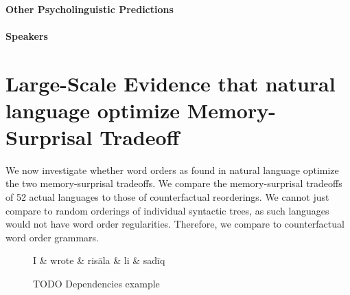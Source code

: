 \documentclass[11pt,letterpaper]{article}
\begin{document}





\paragraph{Other Psycholinguistic Predictions}


\paragraph{Speakers}



\section{Large-Scale Evidence that natural language optimize Memory-Surprisal Tradeoff}

We now investigate whether word orders as found in natural language optimize the two memory-surprisal tradeoffs.
We compare the memory-surprisal tradeoffs of 52 actual languages to those of counterfactual reorderings.
We cannot just compare to random orderings of individual syntactic trees, as such languages would not have word order regularities.
Therefore, we compare to counterfactual word order grammars.

\begin{figure}
\centering
\begin{dependency}[theme = simple]
   \begin{deptext}[column sep=1em]
	   I \&	   wrote \& risāla \& li \& sadīq  \\
   \end{deptext}
\end{dependency}
	\caption{TODO Dependencies example}\label{fig:dependency}
\end{figure}
\end{document}
